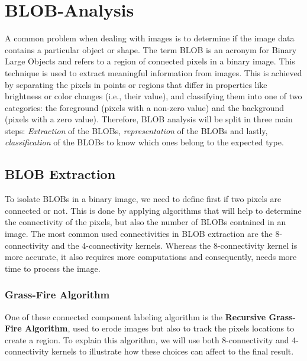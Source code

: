
\section{BLOB-Analysis}
A common problem when dealing with images is to determine if the image data contains a particular object or shape. The term BLOB is an acronym for Binary Large Objects and refers to a region of connected pixels in a binary image. This technique is used to extract meaningful information from images. This is achieved by separating the pixels in points or regions that differ in properties like brightness or color changes (i.e., their value), and classifying them into one of two categories: the foreground (pixels with a non-zero value) and the background (pixels with a zero value).
Therefore, BLOB analysis will be split in three main steps: \textit{Extraction} of the BLOBs, \textit{representation} of the BLOBs and lastly, \textit{classification} of the BLOBs to know which ones belong to the expected type.
\subsection{BLOB Extraction}
To isolate BLOBs in a binary image, we need to define first if two pixels are connected or not. This is done by applying algorithms that will help to determine the connectivity of the pixels, but also the number of BLOBs contained in an image. The most common used connectivities in BLOB extraction are the 8-connectivity and the 4-connectivity kernels. Whereas the 8-connectivity kernel is more accurate, it also requires more computations and consequently, needs more time to process the image.


\subsubsection{Grass-Fire Algorithm}
One of these connected component labeling algorithm is the \textbf{Recursive Grass-Fire Algorithm}, used to erode images but also to track the pixels locations to create a region.
To explain this algorithm, we will use both 8-connectivity and 4-connectivity kernels to illustrate how these choices can affect to the final result.

